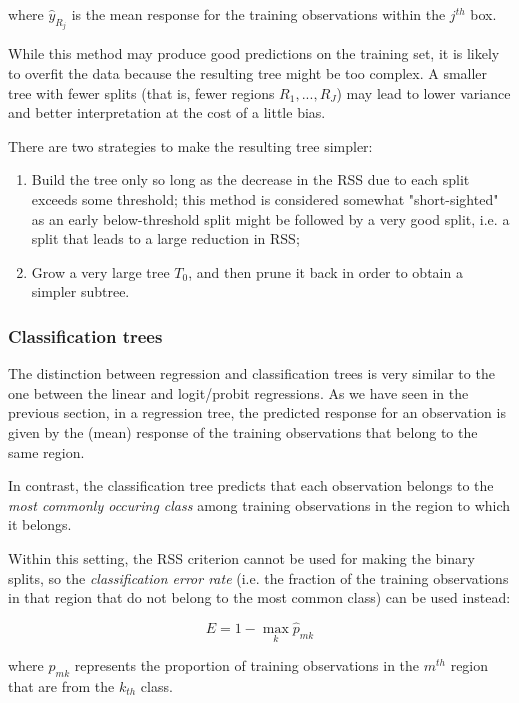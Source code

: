 where $\hat{y}_{R_j}$ is the mean response for the training observations within the $j^{th}$ box.

While this method may produce good predictions on the training set, it is likely to overfit the data because the resulting tree might be too complex. A
smaller tree with fewer splits (that is, fewer regions $R_1, ..., R_J$) may lead to lower variance and better interpretation at the cost of a little bias.

There are two strategies to make the resulting tree simpler:

\begin{enumerate}
    \item Build the tree only so long as the decrease in the RSS due to each split exceeds some threshold; this method is considered somewhat "short-sighted" as an early below-threshold split might be followed by a very good split, i.e. a split that leads to a large reduction in RSS;
    \item Grow a very large tree $T_0$, and then prune it back in order to obtain a simpler subtree.
\end{enumerate}

\subsubsection{Classification trees}
The distinction between regression and classification trees is very similar to the one between the linear and logit/probit regressions. As we have seen in the previous section, in a regression tree, the predicted response for an observation is given by the (mean) response of the training observations that belong to the same region.

In contrast, the classification tree predicts that each observation belongs to the \textit{most commonly occuring class} among training observations in the region to which it belongs.

Within this setting, the RSS criterion cannot be used for making the binary splits, so the \textit{classification error rate} (i.e. the fraction of the training observations in that region that do not belong to the most common class) can be used instead:

\begin{equation}
    E = 1 - \max_k{\hat{p}_{mk}}
\end{equation}

where $\hat{p}_{mk}$ represents the proportion of training observations in the $m^{th}$ region that are from the $k_{th}$ class.

